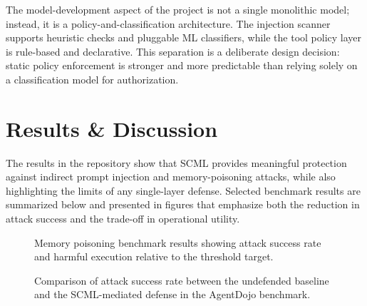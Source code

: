 \documentclass[12pt]{article}
\begin{document}
The model-development aspect of the project is not a single monolithic model; instead, it is a policy-and-classification architecture. The injection scanner supports heuristic checks and pluggable ML classifiers, while the tool policy layer is rule-based and declarative. This separation is a deliberate design decision: static policy enforcement is stronger and more predictable than relying solely on a classification model for authorization.

\section{Results \& Discussion}

The results in the repository show that SCML provides meaningful protection against indirect prompt injection and memory-poisoning attacks, while also highlighting the limits of any single-layer defense. Selected benchmark results are summarized below and presented in figures that emphasize both the reduction in attack success and the trade-off in operational utility.

\begin{figure}[H]
\centering
{}
\caption{Memory poisoning benchmark results showing attack success rate and harmful execution relative to the threshold target.}
\end{figure}

\begin{figure}[H]
\centering
{}
\caption{Comparison of attack success rate between the undefended baseline and the SCML-mediated defense in the AgentDojo benchmark.}
\end{figure}
\end{document}
